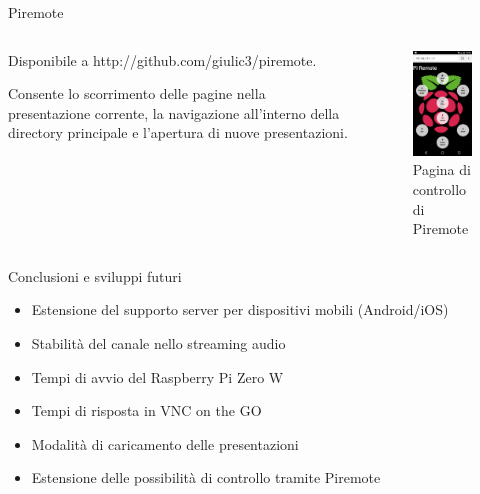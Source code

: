 \documentclass{beamer}
\begin{document}
\begin{frame}[fragile]{Piremote}

\begin{columns}[T]
    \begin{column}{.48\textwidth}
    Disponibile a http://github.com/giulic3/piremote.

    \vspace{1em}
    Consente lo scorrimento delle pagine nella presentazione corrente, la navigazione all'interno della directory principale e l'apertura di nuove presentazioni.

    \end{column}
    \begin{column}{.48\textwidth}
    \begin{figure}
        \includegraphics[scale=0.41]{../img/main_page.jpg}
        \caption{Pagina di controllo di Piremote}
    \end{figure}
    \end{column}
\end{columns}
\end{frame}

\begin{frame}[fragile]{Conclusioni e sviluppi futuri}
 \begin{itemize}
     \item Estensione del supporto server per dispositivi mobili (Android/iOS)
     \item Stabilità del canale nello streaming audio
     \item Tempi di avvio del Raspberry Pi Zero W
     \item Tempi di risposta in VNC on the GO
     \item Modalità di caricamento delle presentazioni
     \item Estensione delle possibilità di controllo tramite Piremote

 \end{itemize}
\end{frame}
\end{document}
